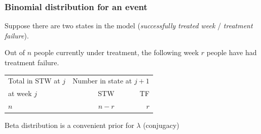\begin{frame}

\frametitle{Binomial distribution for an event}

Suppose there are two states in the model (\emph{successfully treated
  week} / \emph{treatment failure}).

Out of $n$ people currently under treatment, the following week $r$
people have had treatment failure.

\begin{center}

\end{center}

\begin{center}
\begin{tabular}{l||rr}
\hline
Total in STW at $j$ & \multicolumn{2}{c}{Number in state at $j+1$}\\
at week $j$ & STW & TF  \\ \hline
$n$ & $n-r$ & $r$ \\ \hline
\end{tabular}
\end{center}

Beta distribution is a convenient prior for $\lambda$ (conjugacy)

\end{frame}




